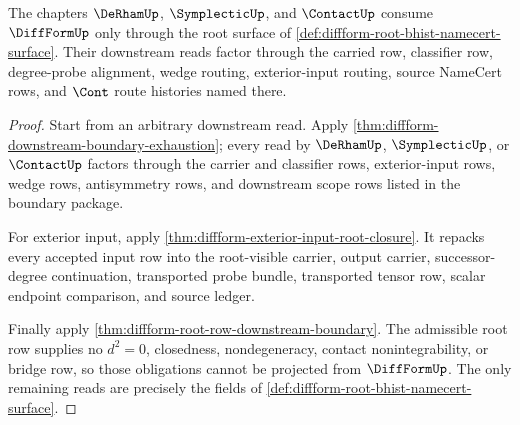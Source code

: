 \begin{theorem}
\label{thm:diffform-root-bhist-downstream-boundary}
The chapters $\DeRhamUp$, $\SymplecticUp$, and $\ContactUp$ consume
$\DiffFormUp$ only through the root surface of
\autoref{def:diffform-root-bhist-namecert-surface}. Their downstream reads
factor through the carried row, classifier row, degree-probe alignment, wedge
routing, exterior-input routing, source NameCert rows, and $\Cont$ route
histories named there.
\end{theorem}
\begin{proof}
Start from an arbitrary downstream read. Apply
\autoref{thm:diffform-downstream-boundary-exhaustion}; every read by
$\DeRhamUp$, $\SymplecticUp$, or $\ContactUp$ factors through the carrier and
classifier rows, exterior-input rows, wedge rows, antisymmetry rows, and
downstream scope rows listed in the boundary package.

For exterior input, apply
\autoref{thm:diffform-exterior-input-root-closure}. It repacks every accepted
input row into the root-visible carrier, output carrier, successor-degree
continuation, transported probe bundle, transported tensor row, scalar
endpoint comparison, and source ledger.

Finally apply \autoref{thm:diffform-root-row-downstream-boundary}. The
admissible root row supplies no $d^2=0$, closedness, nondegeneracy, contact
nonintegrability, or bridge row, so those obligations cannot be projected
from $\DiffFormUp$. The only remaining reads are precisely the fields of
\autoref{def:diffform-root-bhist-namecert-surface}.
\end{proof}
